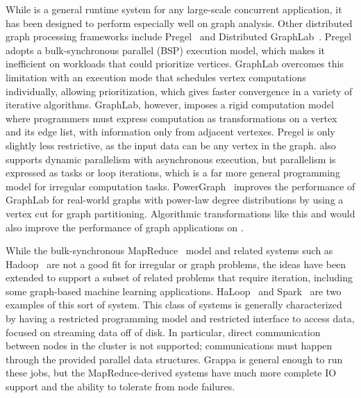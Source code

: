 \vspace{0.5ex}
While \Grappa is a general runtime system for any large-scale
concurrent application, it has been designed to perform especially
well on graph analysis. Other distributed graph processing frameworks
include Pregel~\cite{pregel:2010} and Distributed
GraphLab~\cite{distgraphlab:vldb12}. Pregel adopts a bulk-synchronous
parallel (BSP) execution model, which makes it inefficient on
workloads that could prioritize vertices. GraphLab overcomes this
limitation with an execution mode that schedules vertex computations
individually, allowing prioritization, which gives faster convergence
in a variety of iterative algorithms. GraphLab, however, imposes a
rigid computation model where programmers must express computation as
transformations on a vertex and its edge list, with information only
from adjacent vertexes. Pregel is only slightly less restrictive, as
the input data can be any vertex in the graph. \Grappa also supports
dynamic parallelism with asynchronous execution, but parallelism is
expressed as tasks or loop iterations, which is a far more general
programming model for irregular computation tasks.
PowerGraph~\cite{powergraph:osdi12} improves the performance of
GraphLab for real-world graphs with power-law degree distributions by
using a vertex cut for graph partitioning. Algorithmic transformations
like this  and would also improve the
performance of graph applications on \Grappa.

While the bulk-synchronous MapReduce~\cite{Dean:2008:MSD:1327452.1327492} model and
related systems such as Hadoop~\cite{hadoop} are not a good fit for
irregular or graph problems, the ideas have been extended to support a
subset of related problems that require iteration, including some
graph-based machine learning
applications. HaLoop~\cite{Bu:2010:HEI:1920841.1920881} and
Spark~\cite{Zaharia:2010:SCC:1863103.1863113} are two examples of this
sort of system. This class of systems is generally characterized by
having a restricted programming model and restricted interface to
access data, focused on streaming data off of disk. In particular,
direct communication between nodes in the cluster is not supported;
communications must happen through the provided parallel data
structures. Grappa is general enough to run these jobs, but the
MapReduce-derived systems have much more complete IO support and the
ability to tolerate from node failures.


